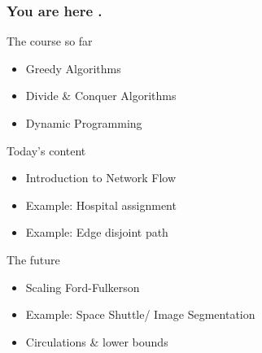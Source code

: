 \begin{frame}
	\frametitle{You are here .}
	\begin{block}{The course so far}
		\begin{itemize}
			\item Greedy Algorithms
			\item Divide \& Conquer Algorithms
			\item Dynamic Programming
		\end{itemize}
	\end{block}
	\pause
	\begin{exampleblock}{Today's content}
		\begin{itemize}
			\item Introduction to Network Flow
			\item Example: Hospital assignment
			\item Example: Edge disjoint path
		\end{itemize}
	\end{exampleblock}
	\pause
	\begin{block}{The future}
		\begin{itemize}
			\item Scaling Ford-Fulkerson
			\item Example: Space Shuttle/ Image Segmentation
			\item Circulations \& lower bounds
		\end{itemize}
	\end{block}
\end{frame}

